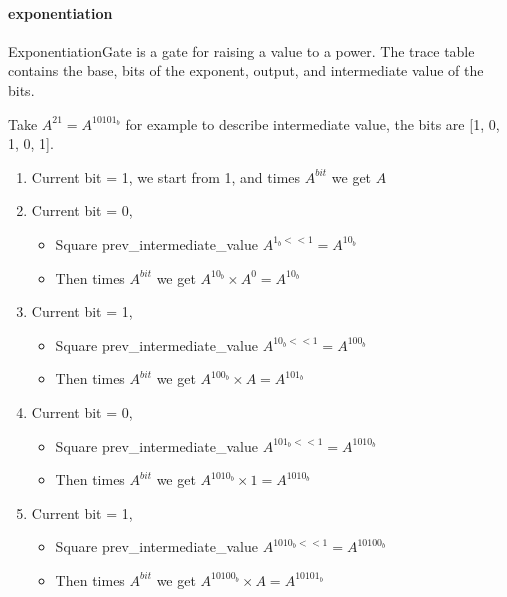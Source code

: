 \paragraph{exponentiation}

\hspace*{\fill}

\indent ExponentiationGate is a gate for raising a value to a power. The trace table contains the base, bits of the exponent, output, and intermediate value of the bits.

Take $A^{21} = A^{10101_b}$ for example to describe intermediate value, the bits are [1, 0, 1, 0, 1].

\begin{enumerate}
    \item Current bit = 1, we start from 1, and times $A^{bit}$ we get $A$
    \item Current bit = 0,
    \begin{itemize}
        \item Square prev\_intermediate\_value $A^{1_b << 1} = A^{10_b}$
        \item Then times $A^{bit}$ we get $A^{10_b} \times A^0 = A^{10_b}$
    \end{itemize}
    \item Current bit = 1,
    \begin{itemize}
        \item Square prev\_intermediate\_value $A^{10_b << 1} = A^{100_b}$
        \item Then times $A^{bit}$ we get $A^{100_b} \times A = A^{101_b}$
    \end{itemize}
    \item Current bit = 0,
    \begin{itemize}
        \item Square prev\_intermediate\_value $A^{101_b << 1} = A^{1010_b}$
        \item Then times $A^{bit}$ we get $A^{1010_b} \times 1 = A^{1010_b}$
    \end{itemize}
    \item Current bit = 1,
    \begin{itemize}
        \item Square prev\_intermediate\_value $A^{1010_b << 1} = A^{10100_b}$
        \item Then times $A^{bit}$ we get $A^{10100_b} \times A = A^{10101_b}$
    \end{itemize}
\end{enumerate}

